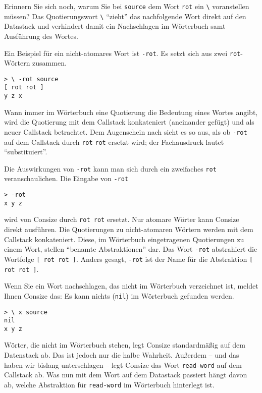 Erinnern Sie sich noch, warum Sie bei \verb|source| dem Wort \verb|rot| ein \verb|\| voranstellen müssen? Das Quotierungswort \verb|\| "`zieht"' das nachfolgende Wort direkt auf den Datastack und verhindert damit ein Nachschlagen im Wörterbuch samt Ausführung des Wortes.

Ein Beispiel für ein nicht-atomares Wort ist \verb|-rot|. Es setzt sich aus zwei \verb|rot|-Wörtern zusammen.

\begin{verbatim}
> \ -rot source
[ rot rot ]
y z x
\end{verbatim}

Wann immer im Wörterbuch eine Quotierung die Bedeutung eines Wortes angibt, wird die Quotierung mit dem Callstack konkateniert (aneinander gefügt) und als neuer Callstack betrachtet. Dem Augenschein nach sieht es so aus, als ob \verb|-rot| auf dem Callstack durch \verb|rot| \verb|rot| ersetzt wird; der Fachausdruck lautet "`substituiert"'. 

Die Auswirkungen von \verb|-rot| kann man sich durch ein zweifaches \verb|rot| veranschaulichen. Die Eingabe von \verb|-rot|

\begin{verbatim}
> -rot
x y z
\end{verbatim}

wird von Consize durch \verb|rot rot| ersetzt. Nur atomare Wörter kann Consize direkt ausführen. Die Quotierungen zu nicht-atomaren Wörtern werden mit dem Callstack konkateniert. Diese, im Wörterbuch eingetragenen Quotierungen zu einem Wort, stellen "`benamte Abstraktionen"' dar. Das Wort \verb|-rot| abstrahiert die Wortfolge \verb|[ rot rot ]|. Anders gesagt, \verb|-rot| ist der Name für die Abstraktion \verb|[ rot rot ]|.

Wenn Sie ein Wort nachschlagen, das nicht im Wörterbuch verzeichnet ist, meldet Ihnen Consize das: Es kann nichts (\verb|nil|) im Wörterbuch gefunden werden.

\begin{verbatim}
> \ x source
nil
x y z
\end{verbatim}

Wörter, die nicht im Wörterbuch stehen, legt Consize standardmäßig auf dem Datenstack ab. Das ist jedoch nur die halbe Wahrheit. Außerdem -- und das haben wir bislang unterschlagen -- legt Consize das Wort \verb|read-word| auf dem Callstack ab. Was nun mit dem Wort auf dem Datastack passiert hängt davon ab, welche Abstraktion für \verb|read-word| im Wörterbuch hinterlegt ist.

